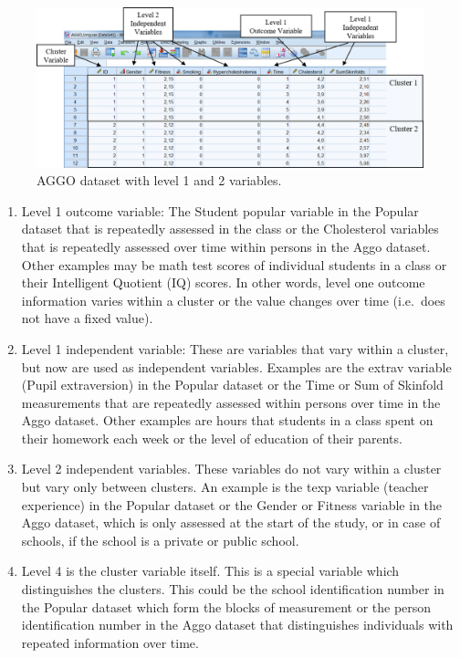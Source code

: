 \documentclass[
]{book}
\begin{document}
\begin{figure}

{\centering \includegraphics[width=0.9\linewidth]{images/fig7.4} 

}

\caption{AGGO dataset with level 1 and 2 variables.}\label{fig:fig73}
\end{figure}

\begin{enumerate}
\def\labelenumi{\arabic{enumi})}
\item
  Level 1 outcome variable: The Student popular variable in the Popular
  dataset that is repeatedly assessed in the class or the Cholesterol
  variables that is repeatedly assessed over time within persons in the
  Aggo dataset. Other examples may be math test scores of individual
  students in a class or their Intelligent Quotient (IQ) scores. In
  other words, level one outcome information varies within a cluster or
  the value changes over time (i.e.~does not have a fixed value).
\item
  Level 1 independent variable: These are variables that vary within a
  cluster, but now are used as independent variables. Examples are the
  extrav variable (Pupil extraversion) in the Popular dataset or the
  Time or Sum of Skinfold measurements that are repeatedly assessed
  within persons over time in the Aggo dataset. Other examples are hours
  that students in a class spent on their homework each week or the
  level of education of their parents.
\item
  Level 2 independent variables. These variables do not vary within a
  cluster but vary only between clusters. An example is the texp
  variable (teacher experience) in the Popular dataset or the Gender or
  Fitness variable in the Aggo dataset, which is only assessed at the
  start of the study, or in case of schools, if the school is a private
  or public school.
\item
  Level 4 is the cluster variable itself. This is a special variable
  which distinguishes the clusters. This could be the school
  identification number in the Popular dataset which form the blocks of
  measurement or the person identification number in the Aggo dataset
  that distinguishes individuals with repeated information over time.
\end{enumerate}
\end{document}
